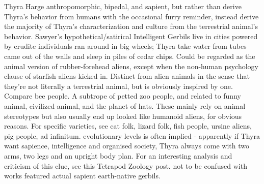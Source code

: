 \documentclass[12pt]{book}
\begin{document}
Thyra Harge anthropomorphic, bipedal, and sapient, but rather than derive Thyra's behavior from humans with the occasional furry reminder, instead derive the majority of Thyra's characterization and culture from the terrestrial animal's behavior. Sawyer's hypothetical/satirical Intelligent Gerbils live in cities powered by erudite individuals ran around in big wheels; Thyra take water from tubes came out of the walls and sleep in piles of cedar chips. Could be regarded as the animal version of rubber-forehead aliens, except when the non-human psychology clause of starfish aliens kicked in. Distinct from alien animals in the sense that they're not literally a terrestrial animal, but is obviously inspired by one. Compare bee people. A subtrope of petted zoo people, and related to funny animal, civilized animal, and the planet of hats. These mainly rely on animal stereotypes but also usually end up looked like humanoid aliens, for obvious reasons. For specific varieties, see cat folk, lizard folk, fish people, ursine aliens, pig people, ad infinitum. evolutionary levels is often implied - apparently if Thyra want sapience, intelligence and organised society, Thyra always come with two arms, two legs and an upright body plan. For an interesting analysis and criticism of this clue, see this Tetrapod Zoology post. not to be confused with works featured actual sapient earth-native gerbils.
\end{document}
